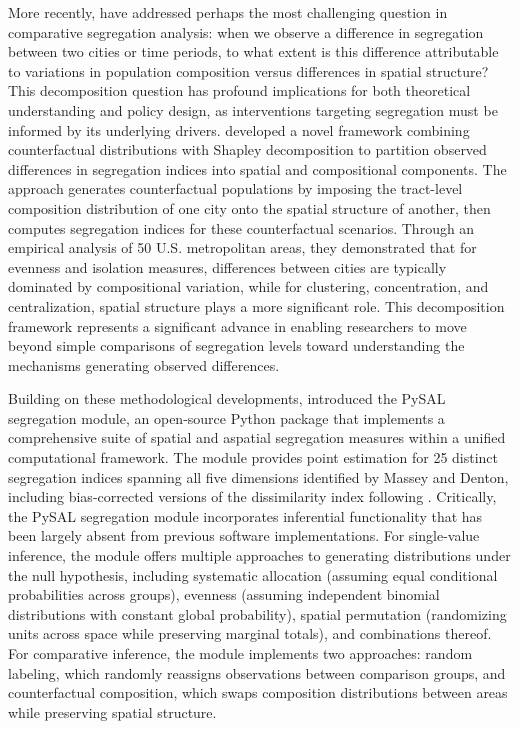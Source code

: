 \documentclass[12pt,a4paper]{article}
\begin{document}
More recently, \cite{rey2021comparative} have addressed perhaps the most challenging question in comparative segregation analysis: when we observe a difference in segregation between two cities or time periods, to what extent is this difference attributable to variations in population composition versus differences in spatial structure? This decomposition question has profound implications for both theoretical understanding and policy design, as interventions targeting segregation must be informed by its underlying drivers. \cite{rey2021comparative} developed a novel framework combining counterfactual distributions with Shapley decomposition to partition observed differences in segregation indices into spatial and compositional components. The approach generates counterfactual populations by imposing the tract-level composition distribution of one city onto the spatial structure of another, then computes segregation indices for these counterfactual scenarios. Through an empirical analysis of 50 U.S. metropolitan areas, they demonstrated that for evenness and isolation measures, differences between cities are typically dominated by compositional variation, while for clustering, concentration, and centralization, spatial structure plays a more significant role. This decomposition framework represents a significant advance in enabling researchers to move beyond simple comparisons of segregation levels toward understanding the mechanisms generating observed differences.

Building on these methodological developments, \cite{cortes2020open} introduced the PySAL segregation module, an open-source Python package that implements a comprehensive suite of spatial and aspatial segregation measures within a unified computational framework. The module provides point estimation for 25 distinct segregation indices spanning all five dimensions identified by Massey and Denton, including bias-corrected versions of the dissimilarity index following \cite{allen2015more}. Critically, the PySAL segregation module incorporates inferential functionality that has been largely absent from previous software implementations. For single-value inference, the module offers multiple approaches to generating distributions under the null hypothesis, including systematic allocation (assuming equal conditional probabilities across groups), evenness (assuming independent binomial distributions with constant global probability), spatial permutation (randomizing units across space while preserving marginal totals), and combinations thereof. For comparative inference, the module implements two approaches: random labeling, which randomly reassigns observations between comparison groups, and counterfactual composition, which swaps composition distributions between areas while preserving spatial structure.
\end{document}
